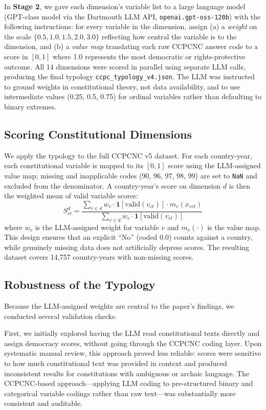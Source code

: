 \documentclass[9pt,twoside]{pnas-new}
\begin{document}
In \textbf{Stage 2}, we gave each dimension's variable list to a large language model (GPT-class model via the Dartmouth LLM API, \texttt{openai.gpt-oss-120b}) with the following instructions: for every variable in the dimension, assign (a) a \emph{weight} on the scale $\{0.5, 1.0, 1.5, 2.0, 3.0\}$ reflecting how central the variable is to the dimension, and (b) a \emph{value map} translating each raw CCPCNC answer code to a score in $[0, 1]$ where 1.0 represents the most democratic or rights-protective outcome. All 14 dimensions were scored in parallel using separate LLM calls, producing the final typology \texttt{ccpc\_typology\_v4.json}. The LLM was instructed to ground weights in constitutional theory, not data availability, and to use intermediate values (0.25, 0.5, 0.75) for ordinal variables rather than defaulting to binary extremes.

\subsection*{Scoring Constitutional Dimensions}

We apply the typology to the full CCPCNC v5 dataset. For each country-year, each constitutional variable is mapped to its $[0,1]$ score using the LLM-assigned value map; missing and inapplicable codes (90, 96, 97, 98, 99) are set to \texttt{NaN} and excluded from the denominator. A country-year's score on dimension $d$ is then the weighted mean of valid variable scores:
\begin{equation}
S_{ct}^{d} = \frac{\sum_{v \in d} w_v \cdot \mathbf{1}[\text{valid}(v_{ct})] \cdot m_v(x_{vct})}{\sum_{v \in d} w_v \cdot \mathbf{1}[\text{valid}(v_{ct})]}
\label{eq:score}
\end{equation}
where $w_v$ is the LLM-assigned weight for variable $v$ and $m_v(\cdot)$ is the value map. This design ensures that an explicit ``No'' (coded 0.0) counts against a country, while genuinely missing data does not artificially depress scores. The resulting dataset covers 14,757 country-years with non-missing scores.

\subsection*{Robustness of the Typology}

Because the LLM-assigned weights are central to the paper's findings, we conducted several validation checks.

First, we initially explored having the LLM read constitutional texts directly and assign democracy scores, without going through the CCPCNC coding layer. Upon systematic manual review, this approach proved less reliable: scores were sensitive to how much constitutional text was provided in context and produced inconsistent results for constitutions with ambiguous or archaic language. The CCPCNC-based approach---applying LLM coding to pre-structured binary and categorical variable codings rather than raw text---was substantially more consistent and auditable.
\end{document}
